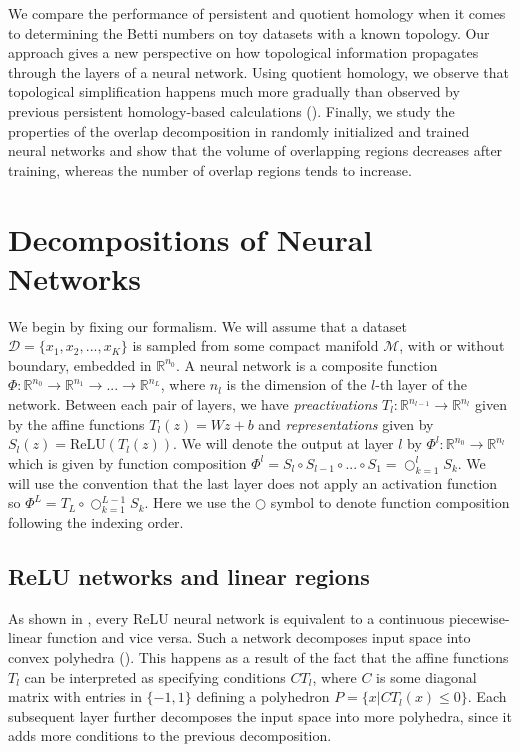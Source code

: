 \documentclass[10pt]{article} %
\theoremstyle{plain}
\theoremstyle{definition}
\theoremstyle{remark}
\begin{document}
We compare the performance of persistent and quotient homology when it comes to determining the Betti numbers {} on toy datasets with a known topology. Our approach gives a new perspective on how topological information propagates through the layers of a neural network. Using quotient homology, we observe that topological simplification happens much more gradually than observed by previous persistent homology-based calculations (\cite{naitzat2020topology}). Finally, we study the properties of the overlap decomposition in randomly initialized and trained neural networks and show that the volume of overlapping regions decreases after training, whereas the number of overlap regions tends to increase.

\section{Decompositions of Neural Networks} 
\label{decompositions}

We begin by fixing our formalism. We will assume that a dataset $\mathcal{D} = \{x_1,x_2,...,x_K\}$ is sampled from some compact manifold $\mathcal{M}$, with or without boundary, embedded in $\mathbb{R}^{n_0}$. A neural network is a composite function $\Phi: \mathbb{R}^{n_0} \to \mathbb{R}^{n_1} \to ... \to \mathbb{R}^{n_L}$, where $n_l$ is the dimension of the $l$-th layer of the network. Between each pair of layers, we have \textit{preactivations} $T_l:\mathbb{R}^{n_{l-1}} \to \mathbb{R}^{n_l}$ given by the affine functions $T_l(z) = Wz+b$ and \textit{representations} given by $S_l(z) = \text{ReLU}(T_l(z))$. We will denote the output at layer $l$ by $\Phi^l:\mathbb{R}^{n_0} \to \mathbb{R}^{n_l}$ which is given by function composition $\Phi^l = S_l \circ S_{l-1} \circ ... \circ S_1 = \bigcirc_{k=1}^{l} S_k$. We will use the convention that the last layer does not apply an activation function so $\Phi^L = T_L \circ \bigcirc_{k=1}^{L-1} S_k$. Here we use the $\bigcirc$ symbol to denote function composition following the indexing order.

\subsection{ReLU networks and linear regions}
As shown in \citet{arora2016understanding}, every ReLU neural network is equivalent to a continuous piecewise-linear function and vice versa. Such a network decomposes input space into convex polyhedra (\cite{montufar2014number, balestriero2019geometry, zhang2020empirical, liu2023relu}). This happens as a result of the fact that the affine functions $T_l$ can be interpreted as specifying conditions $CT_l$, where $C$ is some diagonal matrix with entries in $\{-1,1\}$ defining a polyhedron $P = \{x | CT_l(x) \leq 0 \}$. Each subsequent layer further decomposes the input space into more polyhedra, since it adds more conditions to the previous decomposition. 
\end{document}
